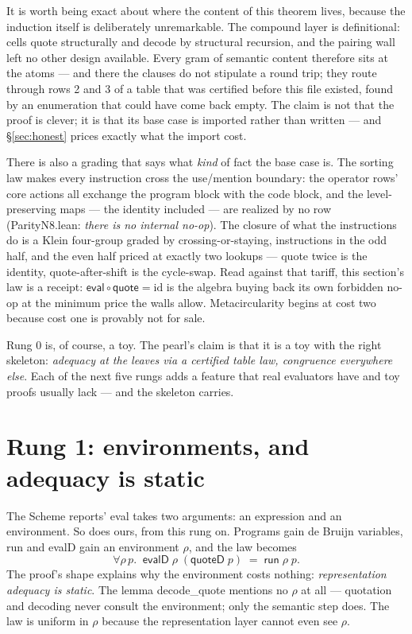 \documentclass[acmsmall,screen,review]{acmart}
\begin{document}
It is worth being exact about where the content of this theorem
lives, because the induction itself is deliberately unremarkable.
The compound layer is definitional: cells quote structurally and
decode by structural recursion, and the pairing wall left no other
design available. Every gram of semantic content therefore sits at
the atoms --- and there the clauses do not stipulate a round trip;
they route through rows 2 and 3 of a table that was certified before
this file existed, found by an enumeration that could have come back
empty. The claim is not that the proof is clever; it is that its
base case is imported rather than written --- and \S\ref{sec:honest}
prices exactly what the import cost.

There is also a grading that says what \emph{kind} of fact the base
case is. The sorting law makes every instruction cross the
use/mention boundary: the operator rows' core actions all exchange
the program block with the code block, and the level-preserving maps
--- the identity included --- are realized by no row
(\textsf{ParityN8.lean}: \emph{there is no internal no-op}). The
closure of what the instructions do is a Klein four-group graded by
crossing-or-staying, instructions in the odd half, and the even half
priced at exactly two lookups --- quote twice is the identity,
quote-after-shift is the cycle-swap. Read against that tariff, this
section's law is a receipt: $\mathsf{eval} \circ \mathsf{quote} =
\mathrm{id}$ is the algebra buying back its own forbidden no-op at
the minimum price the walls allow. Metacircularity begins at cost
two because cost one is provably not for sale.

Rung 0 is, of course, a toy. The pearl's claim is that it is a toy
with the right skeleton: \emph{adequacy at the leaves via a certified
table law, congruence everywhere else}. Each of the next five rungs
adds a feature that real evaluators have and toy proofs usually
lack --- and the skeleton carries.

\section{Rung 1: environments, and adequacy is static}
\label{sec:env}

The Scheme reports' \textsf{eval} takes two arguments: an expression
and an environment. So does ours, from this rung on. Programs gain de
Bruijn variables, \textsf{run} and \textsf{evalD} gain an environment
$\rho$, and the law becomes
\[
  \forall \rho\, p.\;\; \mathsf{evalD}\;\rho\;(\mathsf{quoteD}\;p)
  \;=\; \mathsf{run}\;\rho\;p .
\]
The proof's shape explains why the environment costs nothing:
\emph{representation adequacy is static}. The lemma
\textsf{decode\_quote} mentions no $\rho$ at all --- quotation and
decoding never consult the environment; only the semantic step does.
The law is uniform in $\rho$ because the representation layer cannot
even see $\rho$.
\end{document}
